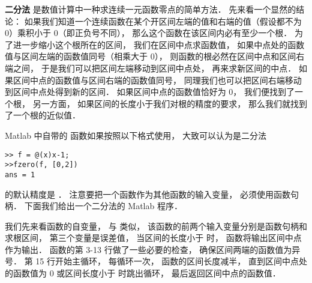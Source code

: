 
\textbf{二分法} 是数值计算中一种求连续一元函数零点的简单方法． 先来看一个显然的结论： 如果我们知道一个连续函数在某个开区间左端的值和右端的值（假设都不为 0）乘积小于 0（即正负号不同）， 那么这个函数在该区间内必有至少一个根． 为了进一步缩小这个根所在的区间， 我们在区间中点求函数值， 如果中点处的函数值与区间左端的函数值同号（相乘大于 0）， 则函数的根必然在区间中点和区间右端之间， 于是我们可以把区间左端移动到区间中点处， 再来求新区间的中点． 如果区间中点的函数值与区间右端的函数值同号， 同理我们也可以把区间右端移动到区间中点处得到新的区间． 如果区间中点的函数值恰好为 0， 我们便找到了一个根， 另一方面， 如果区间的长度小于我们对根的精度的要求， 那么我们就找到了一个根的近似值．

Matlab 中自带的  函数如果按照以下格式使用， 大致可以认为是二分法
\begin{lstlisting}[language=MatlabCom]
>> f = @(x)x-1;
>>fzero(f, [0,2])
ans = 1
\end{lstlisting}
 的默认精度是 ． 注意要把一个函数作为其他函数的输入变量， 必须使用函数句柄． 下面我们给出一个二分法的 Matlab 程序．


我们先来看函数的自变量， 与  类似， 该函数的前两个输入变量分别是函数句柄和求根区间， 第三个变量是误差值， 当区间的长度小于  时， 函数将输出区间中点作为输出． 函数的第 3-13 行做了一些必要的检查， 确保区间两端的函数值为异号． 第 15 行开始主循环， 每循环一次， 函数的区间长度减半， 直到区间中点处的函数值为 0 或区间长度小于  时跳出循环， 最后返回区间中点的函数值．